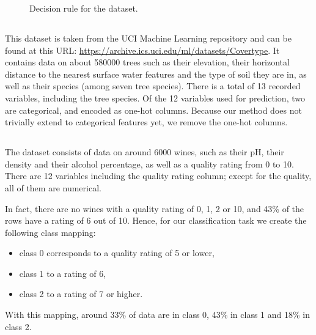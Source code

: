 \documentclass[../main.tex]{subfiles}
\begin{document}
\begin{figure}[h]
    \centering
    
\caption{Decision rule for the \CakeOnSea dataset.}
    \label{fig:cake_on_sea}
\end{figure}

\subsection{\ForestCover}

This dataset is taken from the UCI Machine Learning repository \cite{duaUCI2019} and can be found at this URL: \url{https://archive.ics.uci.edu/ml/datasets/Covertype}. 
It contains data on about 580000 trees such as their elevation, their horizontal distance to the nearest surface water features and the type of soil they are in, as well as their species (among seven tree species). There is a total of 13 recorded variables, including the tree species. Of the 12 variables used for prediction, two are categorical, and encoded as one-hot columns.
Because our method does not trivially extend to categorical features yet, we remove the one-hot columns.

\subsection{\WineQuality}

The \WineQuality dataset consists of data on around 6000 wines, such as their pH, their density and their alcohol percentage, as well as a quality rating from 0 to 10.
There are 12 variables including the quality rating column; except for the quality, all of them are numerical.

In fact, there are no wines with a quality rating of 0, 1, 2 or 10, and 43\% of the rows have a rating of 6 out of 10.
Hence, for our classification task we create the following class mapping:
\begin{itemize}
    \item class 0 corresponds to a quality rating of 5 or lower,
    \item class 1 to a rating of 6,
    \item class 2 to a rating of 7 or higher.
\end{itemize}
With this mapping, around 33\% of data are in class 0, 43\% in class 1 and 18\% in class 2.

\subsection{\OnlineNewsPopularity}
\end{document}
